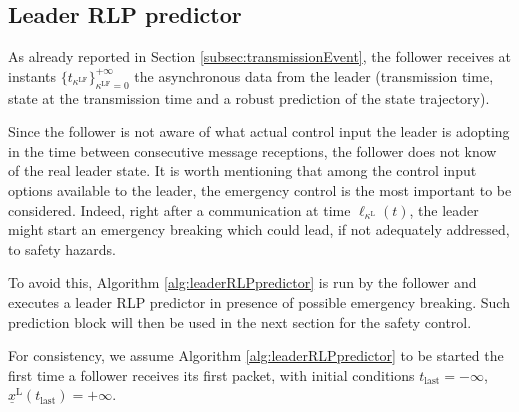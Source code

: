 \documentclass[letterpaper, 10 pt, conference]{ieeeconf}
\theoremstyle{definition}
\theoremstyle{nopoint}
\begin{document}
  
\subsection{Leader RLP predictor}
 \label{subsec:leaderRLPpredictor}

As  already reported in Section \ref{subsec:transmissionEvent}, the follower receives at instants \(\{ t_{\kappa^\mathrm{LF}} \}_{\kappa^\mathrm{LF}=0}^{+\infty}\)
the asynchronous data from the leader (transmission time, state at the transmission time and a robust prediction of the state trajectory). 


Since the follower is not aware of what  actual control input  the leader is adopting in the time between consecutive message receptions, the follower does not know of the real leader state. It is worth mentioning that among the control input options available to the leader, the emergency control is the most important to be considered. Indeed, right after a communication at time $\ell_{\kappa^\mathrm{L}}(t)$, the leader might start an emergency breaking which could lead, if not adequately addressed, to safety hazards. 

To avoid this,  Algorithm \ref{alg:leaderRLPpredictor} is run by the follower and executes a leader RLP predictor in presence of possible emergency breaking. Such prediction block will then be used in the next section for the safety control.

For consistency, we assume Algorithm \ref{alg:leaderRLPpredictor} to be started the first time a follower receives its first packet, with initial conditions $t_{\mathrm{last}}=-\infty$, $\underline{x}^\mathrm{L}(t_{\mathrm{last}})=+\infty$.
\end{document}
